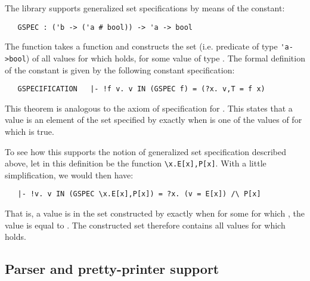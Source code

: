The  library supports generalized set specifications by means of
the constant:

\begin{hol}
\begin{verbatim}
   GSPEC : ('b -> ('a # bool)) -> 'a -> bool
\end{verbatim}
\end{hol}

\noindent The function  takes a function 
and constructs the set (i.e. predicate of type {\small\verb!'a->bool!}) of all
values  for which  holds, for some value  of
type . The formal definition of the constant  is given by the
following constant specification:

\begin{hol}
\begin{verbatim}
   GSPECIFICATION   |- !f v. v IN (GSPEC f) = (?x. v,T = f x)
\end{verbatim}
\end{hol}

\noindent This theorem is analogous to the axiom of specification for .
This states that a value  is an element of the set specified by
 exactly when  is one of the values of  for which
 is true.

To see how this supports the notion of generalized set specification described
above, let  in this definition be the function
{\small\verb!\x.E[x],P[x]!}.  With a little simplification, we would then have:

\begin{hol}
\begin{verbatim}
   |- !v. v IN (GSPEC \x.E[x],P[x]) = ?x. (v = E[x]) /\ P[x]
\end{verbatim}
\end{hol}

\noindent That is, a value  is in the set constructed by 
exactly when for some  for which , the value  is equal to
.  The constructed set therefore contains all values  for
which  holds.

\subsection{Parser and pretty-printer support}\label{abst}

